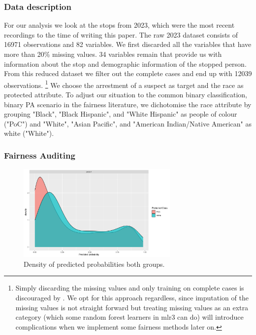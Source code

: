 \subsubsection*{Data description}
For our analysis we look at the stops from 2023, which were the most recent recordings to the time of writing this paper. The raw 2023 dataset consists of 16971 observations and 82 variables. We first discarded all the variables that have more than 20\% missing values.
34 variables remain that provide us with information about the stop and demographic information of the stopped person. From this reduced dataset we filter out the complete cases and end up with 12039 observations.
\footnote{Simply discarding the missing values and only training on complete cases is discouraged by \cite{fernando2021}. We opt for this approach regardless, since imputation of the missing values is not straight forward
but treating missing values as an extra category (which some random forest learners in mlr3 can do) will introduce complications when we implement some fairness methods later on.}
We choose the arrestment of a suspect as target and the race as protected attribute. To adjust our situation to the common binary classification, binary PA scenario in the fairness literature, we dichotomise the race attribute by grouping "Black", "Black Hispanic", and "White Hispanic" as people of colour ("PoC") and "White", "Asian Pacific", and "American Indian/Native American" as white ("White").


\subsubsection*{Fairness Auditing}
\begin{figure}
    \centering
    \includegraphics[width=0.7\textwidth]{../figures/sqf_case_study_plot1.png}
    \caption{Density of predicted probabilities both groups.}
    \label{fig:fairness_density}
\end{figure}

